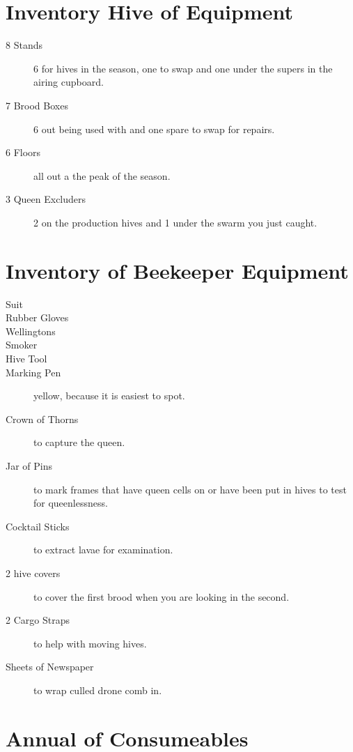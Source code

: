 \documentclass{./BeekeepingBook}
\begin{document}
\section{Inventory Hive of Equipment}

\begin{description}
  \item[8 Stands] 6 for hives in the season, one to swap and one under the supers in the airing cupboard.
  \item[7 Brood Boxes] 6 out being used with and one spare to swap for repairs.
  \item[6 Floors] all out a the peak of the season.
  \item[3 Queen Excluders] 2 on the production hives and 1 under the swarm you just caught.
\end{description}

\section{Inventory of Beekeeper Equipment}

\begin{description}
  \item[Suit]  
  \item[Rubber Gloves] 
  \item[Wellingtons] 
  \item[Smoker] 
  \item[Hive Tool] 
  \item[Marking Pen] yellow, because it is easiest to spot.
  \item[Crown of Thorns]  to capture the queen.
  \item[Jar of Pins]  to mark frames that have queen cells on or have been put in hives to test for queenlessness.
  \item[Cocktail Sticks]  to extract lavae for examination.
  \item[2 hive covers] to cover the first brood when you are looking in the second.
  \item[2 Cargo Straps] to help with moving hives. 
  \item[Sheets of Newspaper] to wrap culled drone comb in.
\end{description}

\section{Annual of Consumeables}
\end{document}
